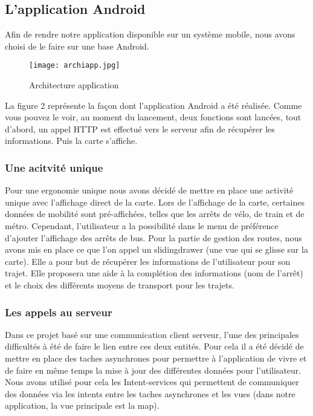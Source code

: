 \documentclass[twocolumn]{article}   		%
\begin{document}
	\subsection{L'application Android}
	
	Afin de rendre notre application disponible sur un syst\`eme mobile, nous avons choisi de le faire sur une base Android.
		
	\begin{figure}[!h]
	\centering
   	\texttt{[image: archiapp.jpg]}
   	\caption{\label{bookOcl} Architecture application}
	\end{figure}
	
	La figure 2 repr\'esente la fa\c con dont l'application Android a \'et\'e r\'ealis\'ee. Comme vous pouvez le voir, au moment du lancement, deux fonctions sont lanc\'ees, tout d'abord, un appel HTTP est effectu\'e vers le serveur afin de r\'ecup\'erer les informations. Puis la carte s'affiche.
	
	\subsubsection{Une acitvit\'e unique}
	
	Pour une ergonomie unique nous avons d\'ecid\'e de mettre en place une activit\'e unique avec l'affichage direct de la carte. Lors de l'affichage de la carte, certaines donn\'ees de mobilit\'e sont pr\'e-affich\'ees, telles que les arr\^ets de v\'elo, de train et de m\'etro. Cependant, l'utilisateur a la possibilit\'e dans le menu de pr\'ef\'erence d'ajouter l'affichage des arr\^ets de bus.
Pour la partie de gestion des routes, nous avons mis en place ce que l'on appel un slidingdrawer (une vue qui se glisse sur la carte). Elle a pour but de r\'ecup\'erer les informations de l'utilisateur pour son trajet. Elle proposera une aide \`a la compl\'etion des informations (nom de l'arr\^et) et le choix des diff\'erents moyens de transport pour les trajets.
 	
	\subsubsection{Les appels au serveur}
	
	Dans ce projet bas\'e sur une communication client serveur, l'une des principales difficult\'es \`a \'et\'e de faire le lien entre ces deux entit\'es. Pour cela il a \'et\'e d\'ecid\'e de mettre en place des taches asynchrones pour permettre \`a l'application de vivre et de faire en m\^eme temps la mise \`a jour des diff\'erentes donn\'ees pour l'utilisateur. Nous avons utilis\'e pour cela les Intent-services qui permettent de communiquer des donn\'ees via les intents entre les taches asynchrones et les vues (dans notre application, la vue principale est la map).
	
\end{document}
